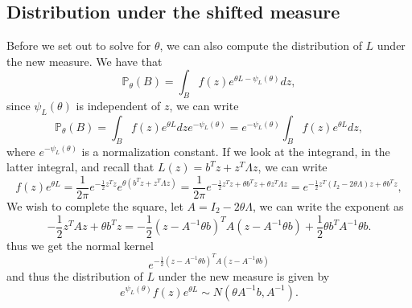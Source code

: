 \documentclass{article}
\begin{document}
\subsection{Distribution under the shifted measure}
Before we set out to solve for $\theta$, we can also compute the distribution of $L$ under the new measure. We have that
\begin{equation*}
    \mathbb{P}_\theta(B) = \int_B f(z)e^{\theta L - \psi_L(\theta)} dz,
\end{equation*}
since $\psi_L(\theta)$ is independent of $z$, we can write
\begin{equation*}
    \mathbb{P}_\theta(B) = \int_B f(z)e^{\theta L} dz e^{-\psi_L(\theta)} = e^{-\psi_L(\theta)}\int_B f(z)e^{\theta L} dz,
    \end{equation*}
where $e^{-\psi_L(\theta)}$ is a normalization constant. If we look at the integrand, in the latter integral, and recall that $L(z) = b^Tz + z^T\Lambda z$, we can write
\begin{equation*}
    f(z)e^{\theta L} = \dfrac{1}{2\pi}e^{-\frac{1}{2}z^Tz}e^{\theta(b^Tz + z^T\Lambda z)} = \dfrac{1}{2\pi}e^{-\frac{1}{2}z^Tz + \theta b^Tz + \theta z^T\Lambda z} = e^{-\frac{1}{2}z^T(I_2 - 2\theta\Lambda)z + \theta b^Tz}, 
\end{equation*}
We wish to complete the square, let $A = I_2 - 2\theta\Lambda$, we can write the exponent as
\begin{equation*}
    -\frac{1}{2}z^TAz + \theta b^Tz = -\frac{1}{2}(z - A^{{-1}}\theta b)^TA(z - A^{-1}\theta b) + \frac{1}{2}\theta b^TA^{-1}\theta b.
\end{equation*}
thus we get the normal kernel 
\begin{equation*}
    e^{-\frac{1}{2}(z - A^{-1}\theta b)^TA(z - A^{-1}\theta b)}
    \end{equation*}
and thus the distribution of $L$ under the new measure is given by
\begin{equation*}
    e^{\psi_L(\theta)}f(z)e^{\theta L} \sim N(\theta A^{-1}b, A^{-1}).
\end{equation*}
\end{document}
